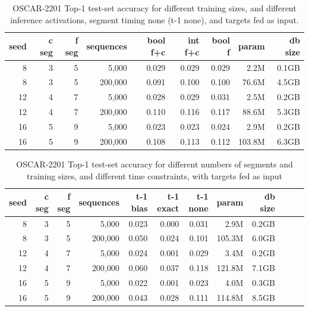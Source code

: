 \begin{table}[H]
\centering
\caption{OSCAR-2201 Top-1 test-set accuracy for different training sizes, and different inference activations, segment timing none (t-1 none), and targets fed as input.}
\label{tab:oscar-test-top1-accuracy-spacyPipelineOptimisations-inferenceActivations}
\begin{tabular}{rrrrrrrrr}
\toprule
\textbf{seed} & \textbf{c seg} & \textbf{f seg} & \textbf{sequences} & \textbf{bool f+c} & \textbf{int f+c} & \textbf{bool f} & \textbf{param} & \textbf{db size} \\
\midrule
8 & 3 & 5 & 5,000     & 0.029 & 0.029 & 0.029 & 2.2M & 0.1GB \\
8 & 3 & 5 & 200,000   & 0.091 & 0.100 & 0.100 & 76.6M & 4.5GB \\
12 & 4 & 7 & 5,000    & 0.028 & 0.029 & 0.031 & 2.5M & 0.2GB \\
12 & 4 & 7 & 200,000  & 0.110 & 0.116 & 0.117 & 88.6M & 5.3GB \\
16 & 5 & 9 & 5,000    & 0.023 & 0.023 & 0.024 & 2.9M & 0.2GB \\
16 & 5 & 9 & 200,000  & 0.108 & 0.113 & 0.112 & 103.8M & 6.3GB \\
\bottomrule
\end{tabular}
\end{table}

\begin{table}[H]
\centering
\caption{OSCAR-2201 Top-1 test-set accuracy for different numbers of segments and training sizes, and different time constraints, with targets fed as input}
\label{tab:oscar-test-top1-accuracy-useBenchmarkDefaultsFalse}
\begin{tabular}{rrrrrrrrrrrr}
\toprule
\textbf{seed} & \textbf{c seg} & \textbf{f seg} & \textbf{sequences} & \textbf{t-1 bias} & \textbf{t-1 exact} & \textbf{t-1 none} & \textbf{param} & \textbf{db size} \\
\midrule
8 & 3 & 5 & 5,000     & 0.023 & 0.000 & 0.031 & 2.9M & 0.2GB \\
8 & 3 & 5 & 200,000   & 0.050 & 0.024 & 0.101 & 105.3M & 6.0GB \\
12 & 4 & 7 & 5,000    & 0.024 & 0.001 & 0.029 & 3.4M & 0.2GB \\
12 & 4 & 7 & 200,000  & 0.060 & 0.037 & 0.118 & 121.8M & 7.1GB \\
16 & 5 & 9 & 5,000    & 0.022 & 0.001 & 0.023 & 4.0M & 0.3GB \\
16 & 5 & 9 & 200,000  & 0.043 & 0.028 & 0.111 & 114.8M & 8.5GB \\
\bottomrule
\end{tabular}
\end{table}

